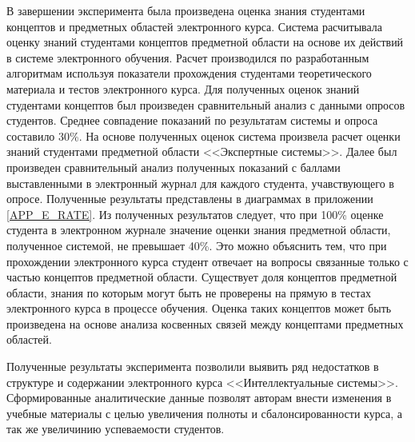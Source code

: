 В завершении эксперимента была произведена оценка знания студентами концептов и предметных областей электронного курса. Система расчитывала оценку знаний студентами концептов предметной области на основе их действий в системе электронного обучения. Расчет производился по разработанным алгоритмам используя показатели прохождения студентами теоретического материала и тестов электронного курса. Для полученных оценок знаний студентами концептов был произведен сравнительный анализ с данными опросов студентов. Среднее совпадение показаний по результатам системы и опроса составило 30\%. На основе полученных оценок система произвела расчет оценки знаний студентами предметной области <<Экспертные системы>>. Далее был произведен сравнительный анализ полученных показаний с баллами выставленными в электронный журнал для каждого студента, учавствующего в опросе. Полученные результаты представлены в диаграммах в приложении \ref{APP_E_RATE}. Из полученных результатов следует, что при 100\% оценке студента в электронном журнале значение оценки знания предметной области, полученное системой, не превышает 40\%. Это можно объяснить тем, что при прохождении электронного курса студент отвечает на вопросы связанные только с частью концептов предметной области. Существует доля концептов предметной области, знания по которым могут быть не проверены на прямую в тестах электронного курса в процессе обучения. Оценка таких концептов может быть произведена на основе анализа косвенных связей между концептами предметных областей.

















Полученные результаты эксперимента позволили выявить ряд недостатков в структуре и содержании электронного курса <<Интеллектуальные системы>>. Сформированные аналитические данные позволят авторам внести изменения в учебные материалы с целью увеличения полноты и сбалонсированности курса, а так же увеличинию успеваемости студентов.

\clearpage